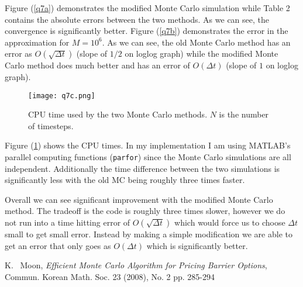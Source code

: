 \documentclass[10pt,english]{article}
\theoremstyle{plain}
\newcommand{\dt}{\Delta t}
\begin{document}
\begin{enumerate}
Figure (\ref{q7a}) demonstrates the modified Monte Carlo simulation while Table 2 contains the absolute errors between the two methods. As we can see, the convergence is significantly better. Figure (\ref{q7b}) demonstrates the error in the approximation for $M=10^{6}$. As we can see, the old Monte Carlo method has an error as $O(\sqrt{\dt})$ (slope of $1/2$ on loglog graph) while the modified Monte Carlo method does much better and has an error of $O(\dt)$ (slope of $1$ on loglog graph).
\begin{figure}
\begin{center}
\texttt{[image: q7c.png]}
\end{center}
\caption{CPU time used by the two Monte Carlo methods. $N$ is the number of timesteps.}\label{q7c}
\end{figure}

Figure (\ref{q7c}) shows the CPU times. In my implementation I am using MATLAB's parallel computing functions (\texttt{parfor}) since the Monte Carlo simulations are all independent. Additionally the time difference between the two simulations is significantly less with the old MC being roughly three times faster. 

Overall we can see significant improvement with the modified Monte Carlo method. The tradeoff is the code is roughly three times slower, however we do not run into a time hitting error of $O(\sqrt{\dt})$ which would force us to choose $\dt$ small to get small error. Instead by making a simple modification we are able to get an error that only goes as $O(\dt)$ which is significantly better.
\end{enumerate}
\begin{thebibliography}{1}
 K. ~Moon, \textit{Efficient Monte Carlo Algorithm for Pricing Barrier Options}, Commun. Korean Math. Soc. 23 (2008), No. 2 pp. 285-294
\end{thebibliography}
\end{document}
